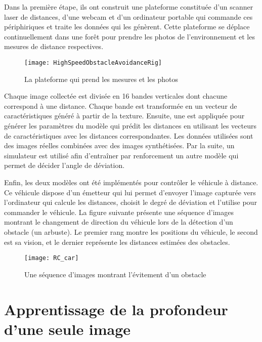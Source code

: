 Dans la première étape, ils ont construit une plateforme constituée d'un
scanner laser de distances, d'une webcam et d'un ordinateur portable qui commande
ces périphiriques et traite les données qui les génèrent. Cette plateforme se
déplace continuellement dans une forêt pour prendre les photos de
l'environnement et les mesures de distance respectives.

\begin{figure}[H]
\begin{center}
\texttt{[image: HighSpeedObstacleAvoidanceRig]}
\caption{La plateforme qui prend les mesures et les photos}{\cite{michels2005high}}
\end{center}
\end{figure}

Chaque image collectée est divisée en 16 bandes verticales dont chacune correspond
à une distance. Chaque bande est transformée en un vecteur de caractéristiques
généré à partir de la texture. Ensuite, une  est
appliquée pour générer les paramètres du modèle qui prédit les distances en
utilisant les vecteurs de caractéristiques avec les distances correspondantes.
Les données utilisées sont des images réelles combinées avec des images synthétisées.
Par la suite, un simulateur est utilisé afin d'entraîner par renforcement un
autre modèle qui permet de décider l'angle de déviation.

Enfin, les deux modèles ont été implémentés pour contrôler le véhicule à
distance. Ce véhicule dispose d'un émetteur qui lui permet d'envoyer l'image
capturée vers l'ordinateur qui calcule les distances, choisit le degré de
déviation et l'utilise pour commander le véhicule. La figure suivante présente
une séquence d'images montrant le changement de direction du véhicule lors de
la détection d'un obstacle (un arbuste). Le premier rang montre les positions
du véhicule, le second est sa vision, et le dernier représente les distances
estimées des obstacles.

\begin{figure}[H]
\texttt{[image: RC\_car]}
\caption{Une séquence d'images montrant l'évitement d'un obstacle}{\cite{michels2005high}}
\end{figure}

\section{Apprentissage de la profondeur d'une seule image}

